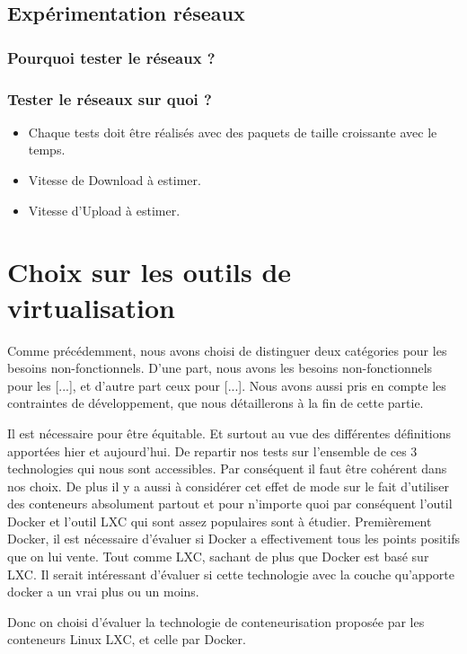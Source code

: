 \subsection{Expérimentation réseaux}

\subsubsection{Pourquoi tester le réseaux ? }

\subsubsection{Tester le réseaux sur quoi ?  }

\begin{itemize}
\item Chaque tests doit être réalisés avec des paquets de taille croissante avec le temps.
\item Vitesse de Download à estimer.
\item Vitesse d'Upload à estimer.
\end{itemize}

\section{Choix sur les outils de virtualisation}

Comme précédemment, nous avons choisi de distinguer deux catégories pour les besoins non-fonctionnels. D'une part, nous avons les besoins non-fonctionnels pour les [...], et d'autre part ceux pour [...]. Nous avons aussi pris en compte les contraintes de développement, que nous détaillerons à la fin de cette partie.


Il est nécessaire pour être équitable. Et surtout au vue des différentes définitions apportées hier et aujourd'hui. De repartir nos tests sur l'ensemble de ces 3 technologies qui nous sont accessibles. Par conséquent il faut être cohérent dans nos choix. De plus il y a aussi à considérer cet effet de mode sur le fait d'utiliser des conteneurs absolument partout et pour n'importe quoi par conséquent l’outil Docker et l'outil LXC qui sont assez populaires sont à étudier. Premièrement Docker, il est nécessaire d'évaluer si Docker a effectivement tous les points positifs que on lui vente. Tout comme LXC, sachant de plus que Docker est basé sur LXC. Il serait intéressant d’évaluer si cette technologie avec la couche qu'apporte docker a un vrai plus ou un moins.

Donc on choisi d'évaluer la technologie de conteneurisation proposée par les conteneurs Linux LXC, et celle par Docker.

